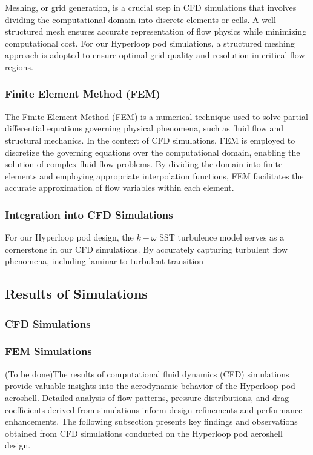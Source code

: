 Meshing, or grid generation, is a crucial step in CFD simulations that involves dividing the computational domain into discrete elements or cells. A well-structured mesh ensures accurate representation of flow physics while minimizing computational cost. For our Hyperloop pod simulations, a structured meshing approach is adopted to ensure optimal grid quality and resolution in critical flow regions.

\subsubsection{Finite Element Method (FEM)}

The Finite Element Method (FEM) is a numerical technique used to solve partial differential equations governing physical phenomena, such as fluid flow and structural mechanics. In the context of CFD simulations, FEM is employed to discretize the governing equations over the computational domain, enabling the solution of complex fluid flow problems. By dividing the domain into finite elements and employing appropriate interpolation functions, FEM facilitates the accurate approximation of flow variables within each element.

\subsubsection{Integration into CFD Simulations}

For our Hyperloop pod design, the \(k-\omega\) SST turbulence model serves as a cornerstone in our CFD simulations. By accurately capturing turbulent flow phenomena, including laminar-to-turbulent transition
\subsection{Results of Simulations}
\subsubsection{CFD Simulations}
\subsubsection{FEM Simulations}


(To be done)The results of computational fluid dynamics (CFD) simulations provide valuable insights into the aerodynamic behavior of the Hyperloop pod aeroshell. Detailed analysis of flow patterns, pressure distributions, and drag coefficients derived from simulations inform design refinements and performance enhancements. The following subsection presents key findings and observations obtained from CFD simulations conducted on the Hyperloop pod aeroshell design.

